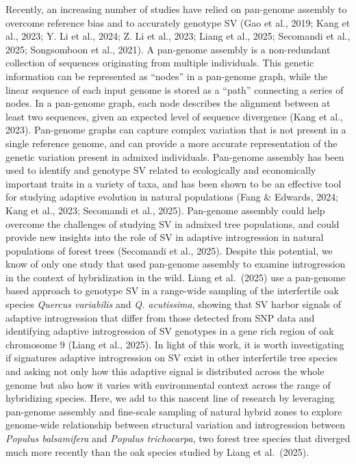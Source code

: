 \documentclass[
]{agujournal2019}
\begin{document}
Recently, an increasing number of studies have relied on pan-genome
assembly to overcome reference bias and to accurately genotype SV (Gao
et al., 2019; Kang et al., 2023; Y. Li et al., 2024; Z. Li et al., 2023;
Liang et al., 2025; Secomandi et al., 2025; Songsomboon et al., 2021). A
pan-genome assembly is a non-redundant collection of sequences
originating from multiple individuals. This genetic information can be
represented as ``nodes'' in a pan-genome graph, while the linear
sequence of each input genome is stored as a ``path'' connecting a
series of nodes. In a pan-genome graph, each node describes the
alignment between at least two sequences, given an expected level of
sequence divergence (Kang et al., 2023). Pan-genome graphs can capture
complex variation that is not present in a single reference genome, and
can provide a more accurate representation of the genetic variation
present in admixed individuals. Pan-genome assembly has been used to
identify and genotype SV related to ecologically and economically
important traits in a variety of taxa, and has been shown to be an
effective tool for studying adaptive evolution in natural populations
(Fang \& Edwards, 2024; Kang et al., 2023; Secomandi et al., 2025).
Pan-genome assembly could help overcome the challenges of studying SV in
admixed tree populations, and could provide new insights into the role
of SV in adaptive introgression in natural populations of forest trees
(Secomandi et al., 2025). Despite this potential, we know of only one
study that used pan-genome assembly to examine introgression in the
context of hybridization in the wild. Liang et al.~(2025) use a
pan-genome based approach to genotype SV in a range-wide sampling of the
interfertile oak species \emph{Quercus variabilis} and \emph{Q.
acutissima}, showing that SV harbor signals of adaptive introgression
that differ from those detected from SNP data and identifying adaptive
introgression of SV genotypes in a gene rich region of oak chromosome 9
(Liang et al., 2025). In light of this work, it is worth investigating
if signatures adaptive introgression on SV exist in other interfertile
tree species and asking not only how this adaptive signal is distributed
across the whole genome but also how it varies with environmental
context across the range of hybridizing species. Here, we add to this
nascent line of research by leveraging pan-genome assembly and
fine-scale sampling of natural hybrid zones to explore genome-wide
relationship between structural variation and introgression between
\emph{Populus balsamifera} and \emph{Populus trichocarpa}, two forest
tree species that diverged much more recently than the oak species
studied by Liang et al.~(2025).
\end{document}

